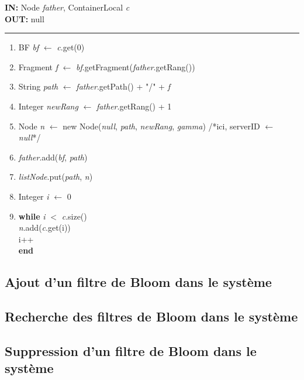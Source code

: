 \documentclass[a4paper,11pt]{report}
\begin{document}
\begin{flushleft}
	\begin{framed}
		\textbf{IN:} Node \textit{father}, ContainerLocal \textit{c}\\
		\textbf{OUT:} null\\
		\noindent\rule{\linewidth}{0.5pt}

		\begin{enumerate}
			\item BF \textit{bf} $\leftarrow$ \textit{c}.get(0)
			\item Fragment \textit{f} $\leftarrow$ \textit{bf}.getFragment(\textit{father}.getRang())
			\item String \textit{path} $\leftarrow$ \textit{father}.getPath() + "/" + \textit{f}
			\item Integer \textit{newRang} $\leftarrow$ \textit{father}.getRang() + 1
			\item Node \textit{n} $\leftarrow$ new Node(\textit{null}, \textit{path}, \textit{newRang}, \textit{gamma}) /*ici, serverID $\leftarrow$ \textit{null}*/
			\item \textit{father}.add(\textit{bf}, \textit{path})
			\item \textit{listNode}.put(\textit{path}, \textit{n})
			\item Integer \textit{i} $\leftarrow$ 0
			\item
				\begin{tabbing}
					\textbf{wh}\=\textbf{ile }\= \textit{i} $<$ \textit{c}.size()\\
						\> \textit{n}.add(\textit{c}.get(i))\\
						\> i++\\
					\textbf{end}
				\end{tabbing}									
		\end{enumerate}	
	\end{framed}
\end{flushleft}

	
\subsection{Ajout d'un filtre de Bloom dans le système}
	
	
\subsection{Recherche des filtres de Bloom dans le système}


\subsection{Suppression d'un filtre de Bloom dans le système}
\end{document}
